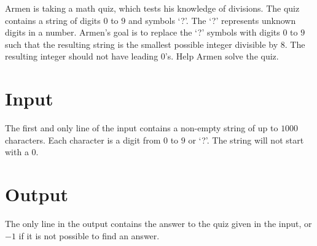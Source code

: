 
Armen is taking a math quiz, which tests his knowledge of divisions.
The quiz contains a string of digits $0$ to $9$ and symbols `?'.
The `?' represents unknown digits in a number.
Armen's goal is to replace the `?' symbols with digits $0$ to $9$ such that the resulting string is the smallest possible integer divisible by 8.
The resulting integer should not have leading $0$'s.
Help Armen solve the quiz.

\section*{Input}
The first and only line of the input contains a non-empty string of up to $1000$ characters.
Each character is a digit from $0$ to $9$ or `?'.
The string will not start with a $0$.


\section*{Output}
The only line in the output contains the answer to the quiz given in the input, or $-1$ if it is not possible to find an answer.

